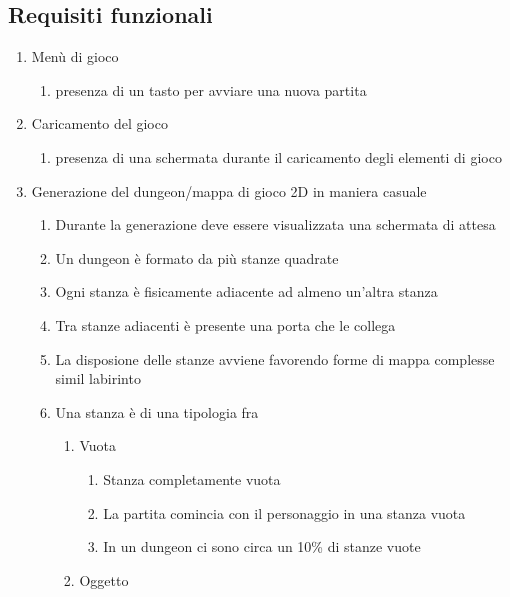 \subsection{Requisiti funzionali}
\begin{enumerate}
    \item Menù di gioco
    \begin{enumerate}
        \item presenza di un tasto per avviare una nuova partita
    \end{enumerate}
    \item Caricamento del gioco
    \begin{enumerate}
        \item presenza di una schermata durante il caricamento degli elementi di gioco
    \end{enumerate}
    \item Generazione del dungeon/mappa di gioco 2D in maniera casuale
    \begin{enumerate}
        \item Durante la generazione deve essere visualizzata una schermata di attesa
        \item Un dungeon è formato da più stanze quadrate
        \item Ogni stanza è fisicamente adiacente ad almeno un'altra stanza
        \item Tra stanze adiacenti è presente una porta che le collega
        \item La disposione delle stanze avviene favorendo forme di mappa complesse simil labirinto 
        \item Una stanza è di una tipologia fra
            \begin{enumerate}
                \item Vuota
                    \begin{enumerate}
                        \item Stanza completamente vuota
                        \item La partita comincia con il personaggio in una stanza vuota
                        \item In un dungeon ci sono circa un 10\% di stanze vuote
                    \end{enumerate}
                \item Oggetto
                    \begin{enumerate}

\end{enumerate}
\end{enumerate}
\end{enumerate}
\end{enumerate}
